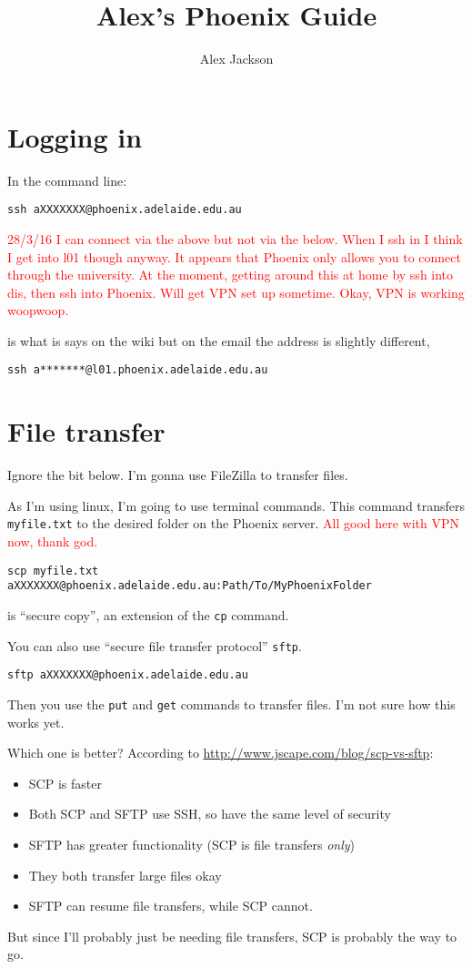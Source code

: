 \documentclass[a4]{article}
\title{Alex's Phoenix Guide}
\author{Alex Jackson}
\begin{document}
\maketitle

\section{Logging in}
In the command line:
\begin{lstlisting}
ssh aXXXXXXX@phoenix.adelaide.edu.au
\end{lstlisting}
\textcolor{red}{28/3/16 I can connect via the above but not via the below. When I ssh in I think I get into l01 though anyway. It appears that Phoenix only allows you to connect through the university. At the moment, getting around this at home by ssh into dis, then ssh into Phoenix. Will get VPN set up sometime. Okay, VPN is working woopwoop.}

is what is says on the wiki but on the email the address is slightly different,
\begin{lstlisting}
ssh a*******@l01.phoenix.adelaide.edu.au
\end{lstlisting}

\section{File transfer}
Ignore the bit below. I'm gonna use FileZilla to transfer files.

As I'm using linux, I'm going to use terminal commands. This command transfers \texttt{myfile.txt} to the desired folder on the Phoenix server. \textcolor{red}{All good here with VPN now, thank god.}
\begin{lstlisting}
scp myfile.txt aXXXXXXX@phoenix.adelaide.edu.au:Path/To/MyPhoenixFolder
\end{lstlisting}
is ``secure copy'', an extension of the \texttt{cp} command.

You can also use ``secure file transfer protocol'' \texttt{sftp}. 
\begin{lstlisting}
sftp aXXXXXXX@phoenix.adelaide.edu.au
\end{lstlisting}
Then you use the \texttt{put} and \texttt{get} commands to transfer files. I'm not sure how this works yet.

Which one is better? According to \url{http://www.jscape.com/blog/scp-vs-sftp}:
\begin{itemize}
  \item SCP is faster
  \item Both SCP and SFTP use SSH, so have the same level of security
  \item SFTP has greater functionality (SCP is file transfers \emph{only})
  \item They both transfer large files okay
  \item SFTP can resume file transfers, while SCP cannot.
\end{itemize} 
But since I'll probably just be needing file transfers, SCP is probably the way to go.
\end{document}

